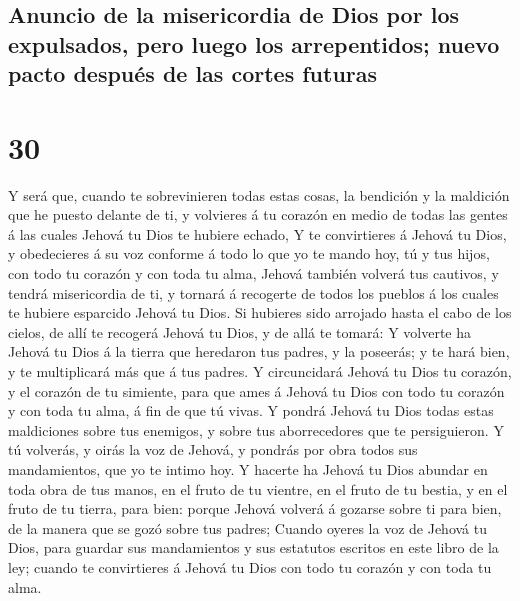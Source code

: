 \hypertarget{anuncio-de-la-misericordia-de-dios-por-los-expulsados-pero-luego-los-arrepentidos-nuevo-pacto-despuuxe9s-de-las-cortes-futuras}{%
\subsection{Anuncio de la misericordia de Dios por los expulsados, pero
luego los arrepentidos; nuevo pacto después de las cortes
futuras}\label{anuncio-de-la-misericordia-de-dios-por-los-expulsados-pero-luego-los-arrepentidos-nuevo-pacto-despuuxe9s-de-las-cortes-futuras}}

\hypertarget{section-29}{%
\section{30}\label{section-29}}

 Y será que, cuando te sobrevinieren todas estas cosas, la
bendición y la maldición que he puesto delante de ti, y volvieres á tu
corazón en medio de todas las gentes á las cuales Jehová tu Dios te
hubiere echado,  Y te convirtieres á Jehová tu Dios, y
obedecieres á su voz conforme á todo lo que yo te mando hoy, tú y tus
hijos, con todo tu corazón y con toda tu alma,  Jehová
también volverá tus cautivos, y tendrá misericordia de ti, y tornará á
recogerte de todos los pueblos á los cuales te hubiere esparcido Jehová
tu Dios.  Si hubieres sido arrojado hasta el cabo de los
cielos, de allí te recogerá Jehová tu Dios, y de allá te tomará:
 Y volverte ha Jehová tu Dios á la tierra que heredaron
tus padres, y la poseerás; y te hará bien, y te multiplicará más que á
tus padres.  Y circuncidará Jehová tu Dios tu corazón, y
el corazón de tu simiente, para que ames á Jehová tu Dios con todo tu
corazón y con toda tu alma, á fin de que tú vivas.  Y
pondrá Jehová tu Dios todas estas maldiciones sobre tus enemigos, y
sobre tus aborrecedores que te persiguieron.  Y tú
volverás, y oirás la voz de Jehová, y pondrás por obra todos sus
mandamientos, que yo te intimo hoy.  Y hacerte ha Jehová
tu Dios abundar en toda obra de tus manos, en el fruto de tu vientre, en
el fruto de tu bestia, y en el fruto de tu tierra, para bien: porque
Jehová volverá á gozarse sobre ti para bien, de la manera que se gozó
sobre tus padres;  Cuando oyeres la voz de Jehová tu
Dios, para guardar sus mandamientos y sus estatutos escritos en este
libro de la ley; cuando te convirtieres á Jehová tu Dios con todo tu
corazón y con toda tu alma.

